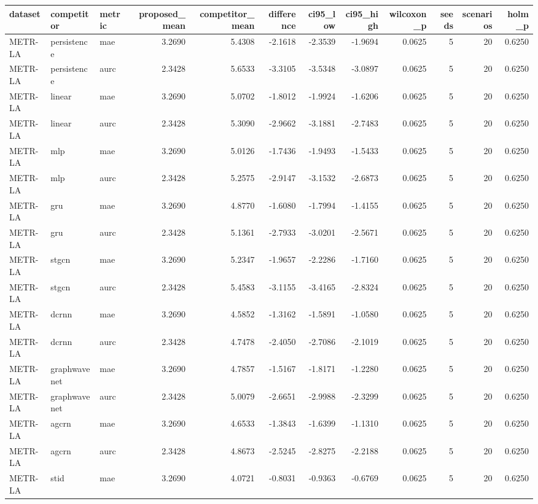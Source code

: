 \begin{tabular}{lllrrrrrrrrr}
\toprule
dataset & competitor & metric & proposed\_mean & competitor\_mean & difference & ci95\_low & ci95\_high & wilcoxon\_p & seeds & scenarios & holm\_p \\
\midrule
METR-LA & persistence & mae & 3.2690 & 5.4308 & -2.1618 & -2.3539 & -1.9694 & 0.0625 & 5 & 20 & 0.6250 \\
METR-LA & persistence & aurc & 2.3428 & 5.6533 & -3.3105 & -3.5348 & -3.0897 & 0.0625 & 5 & 20 & 0.6250 \\
METR-LA & linear & mae & 3.2690 & 5.0702 & -1.8012 & -1.9924 & -1.6206 & 0.0625 & 5 & 20 & 0.6250 \\
METR-LA & linear & aurc & 2.3428 & 5.3090 & -2.9662 & -3.1881 & -2.7483 & 0.0625 & 5 & 20 & 0.6250 \\
METR-LA & mlp & mae & 3.2690 & 5.0126 & -1.7436 & -1.9493 & -1.5433 & 0.0625 & 5 & 20 & 0.6250 \\
METR-LA & mlp & aurc & 2.3428 & 5.2575 & -2.9147 & -3.1532 & -2.6873 & 0.0625 & 5 & 20 & 0.6250 \\
METR-LA & gru & mae & 3.2690 & 4.8770 & -1.6080 & -1.7994 & -1.4155 & 0.0625 & 5 & 20 & 0.6250 \\
METR-LA & gru & aurc & 2.3428 & 5.1361 & -2.7933 & -3.0201 & -2.5671 & 0.0625 & 5 & 20 & 0.6250 \\
METR-LA & stgcn & mae & 3.2690 & 5.2347 & -1.9657 & -2.2286 & -1.7160 & 0.0625 & 5 & 20 & 0.6250 \\
METR-LA & stgcn & aurc & 2.3428 & 5.4583 & -3.1155 & -3.4165 & -2.8324 & 0.0625 & 5 & 20 & 0.6250 \\
METR-LA & dcrnn & mae & 3.2690 & 4.5852 & -1.3162 & -1.5891 & -1.0580 & 0.0625 & 5 & 20 & 0.6250 \\
METR-LA & dcrnn & aurc & 2.3428 & 4.7478 & -2.4050 & -2.7086 & -2.1019 & 0.0625 & 5 & 20 & 0.6250 \\
METR-LA & graphwavenet & mae & 3.2690 & 4.7857 & -1.5167 & -1.8171 & -1.2280 & 0.0625 & 5 & 20 & 0.6250 \\
METR-LA & graphwavenet & aurc & 2.3428 & 5.0079 & -2.6651 & -2.9988 & -2.3299 & 0.0625 & 5 & 20 & 0.6250 \\
METR-LA & agcrn & mae & 3.2690 & 4.6533 & -1.3843 & -1.6399 & -1.1310 & 0.0625 & 5 & 20 & 0.6250 \\
METR-LA & agcrn & aurc & 2.3428 & 4.8673 & -2.5245 & -2.8275 & -2.2188 & 0.0625 & 5 & 20 & 0.6250 \\
METR-LA & stid & mae & 3.2690 & 4.0721 & -0.8031 & -0.9363 & -0.6769 & 0.0625 & 5 & 20 & 0.6250 \\

\end{tabular}
